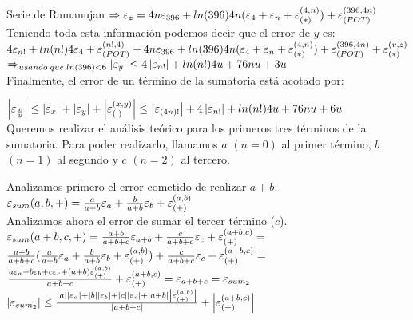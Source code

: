 \begin{subsection}{Serie de Ramanujan}
	$\Rightarrow \varepsilon _{z} = 4n\varepsilon _{396} + ln(396)4n(\varepsilon _{4} + \varepsilon _{n} + \varepsilon _{({*})}^{({4,n})}) + \varepsilon _{({POT})}^{({396,4n})}$\\
	
	Teniendo toda esta información podemos decir que el error de $y$ es:\\
	
	$4\varepsilon _{n!} + ln(n!) 4\varepsilon _{4} + \varepsilon _{({POT})}^{({n!,4})} + 4n\varepsilon _{396} + ln(396)4n(\varepsilon _{4} + \varepsilon _{n} + \varepsilon _{({*})}^{({4,n})}) + \varepsilon _{({POT})}^{({396,4n})} + \varepsilon _{({*})}^{({v,z})}$\\
	
	$\Rightarrow_{usando\;que\;ln(396)<6} \left|\varepsilon _{y}\right| \leq 4\left|\varepsilon _{n!}\right| + ln(n!)4u + 76nu + 3u$\\
	
	Finalmente, el error de un término de la sumatoria está acotado por:
	
	\pa

	$\left|\varepsilon _{\frac{x}{y}}\right| \leq \left|\varepsilon _{x}\right| + \left|\varepsilon _{y}\right| + \left|\varepsilon _{({:})}^{({x,y})}\right| \leq \left|\varepsilon _{(4n)!}\right| + 4\left|\varepsilon _{n!}\right| + ln(n!)4u + 76nu + 6u$\\
	
	Queremos realizar el análisis teórico para los primeros tres términos de la sumatoria. Para poder realizarlo, llamamos $a$ $(n=0)$ al primer término,
	$b$ $(n=1)$ al segundo y $c$ $(n=2)$ al tercero.
	
	Analizamos primero el error cometido de realizar $a+b$.\\
	
	$\varepsilon _{sum}({a,b,+}) = \frac{a}{a+b}\varepsilon _{a} + \frac{b}{a+b}\varepsilon _{b} + \varepsilon _{({+})}^{({a,b})}$\\
	
	Analizamos ahora el error de sumar el tercer término ($c$).\\
		
	$\varepsilon _{sum}({a+b,c,+}) = \frac{a+b}{a+b+c}\varepsilon _{a+b} + \frac{c}{a+b+c}\varepsilon _{c} + \varepsilon _{({+})}^{({a+b,c})} =$\\
	
	$\frac{a+b}{a+b+c}(\frac{a}{a+b}\varepsilon _{a} + \frac{b}{a+b}\varepsilon _{b} + \varepsilon _{({+})}^{({a,b})}) + \frac{c}{a+b+c}\varepsilon _{c} + \varepsilon _{({+})}^{({a+b,c})} =$\\
	
	$\frac{a\varepsilon _{a} + b\varepsilon _{b} + c\varepsilon _{c} + (a+b)\varepsilon _{({+})}^{({a,b})}}{a+b+c} + \varepsilon _{({+})}^{({a+b,c})} = \varepsilon _{a+b+c} = \varepsilon _{sum_2}$\\
	
	$\left|\varepsilon _{sum_2}\right| \leq \frac{|a||\varepsilon _{a}| + |b||\varepsilon _{b}| + |c||\varepsilon _{c}| + |a+b|\left|\varepsilon _{({+})}^{({a,b})}\right|}{|a+b+c|} + \left|\varepsilon _{({+})}^{({a+b,c})}\right|$\\
	

\end{subsection}
